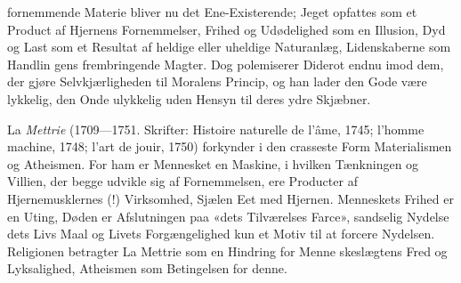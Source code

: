 \documentclass[12pt,a4paper]{book}
\begin{document}
fornemmende Materie bliver nu det Ene-Existerende; Jeget
opfattes som et Product af Hjernens Fornemmelser, Frihed og
Udødelighed som en Illusion, Dyd og Last som et Resultat af
heldige eller uheldige Naturanlæg, Lidenskaberne som Handlin\-%
gens frembringende Magter. Dog polemiserer Diderot endnu
imod dem, der gjøre Selvkjærligheden til Moralens Princip, og
han lader den Gode være lykkelig, den Onde ulykkelig uden
Hensyn til deres ydre Skjæbner.

La \emph{Mettrie} (1709---1751. Skrifter: Histoire naturelle
de l'âme, 1745; l'homme machine, 1748; l'art de jouir, 1750)
forkynder i den crasseste Form Materialismen og Atheismen.
For ham er Mennesket en Maskine, i hvilken Tænkningen og
Villien, der begge udvikle sig af Fornemmelsen, ere Producter
af Hjernemusklernes (!) Virksomhed, Sjælen Eet med Hjernen.
Menneskets Frihed er en Uting, Døden er Afslutningen paa
«dets Tilværelses Farce», sandselig Nydelse dets Livs Maal og
Livets Forgængelighed kun et Motiv til at forcere Nydelsen.
Religionen betragter La Mettrie som en Hindring for Menne\-%
skeslægtens Fred og Lyksalighed, Atheismen som Betingelsen
for denne.
\end{document}
